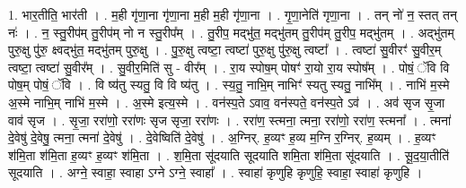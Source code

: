 \documentclass[17pt]{extarticle}
\begin{document}
1. भार॒तीति॒ भार॑ती । . म॒ही गृ॑णा॒ना गृ॑णा॒ना म॒ही म॒ही गृ॑णा॒ना । . गृ॒णा॒नेति॑ गृणा॒ना । . तन् नो॑ न॒ स्तत् तन् नः॑ । . न॒ स्तु॒रीप॑म् तु॒रीप॑म् नो न स्तु॒रीप᳚म् । . तु॒रीप॒ मद्भु॑त॒ मद्भु॑तम् तु॒रीप॑म् तु॒रीप॒ मद्भु॑तम् । . अद्भु॑तम् पुरु॒क्षु पु॑रु॒ क्ष्वद्भु॑त॒ मद्भु॑तम् पुरु॒क्षु । . पु॒रु॒क्षु त्वष्टा॒ त्वष्टा॑ पुरु॒क्षु पु॑रु॒क्षु त्वष्टा᳚ । . त्वष्टा॑ सु॒वीरꣳ॑ सु॒वीर॒म् त्वष्टा॒ त्वष्टा॑ सु॒वीर᳚म् । . सु॒वीर॒मिति॑ सु - वीर᳚म् । . रा॒य स्पोष॒म् पोषꣳ॑ रा॒यो रा॒य स्पोष᳚म् । . पोषं॒ ॅवि वि पोष॒म् पोषं॒ ॅवि । . वि ष्य॑तु स्यतु॒ वि वि ष्य॑तु । . स्य॒तु॒ नाभि॒म् नाभिꣳ॑ स्यतु स्यतु॒ नाभि᳚म् । . नाभि॑ म॒स्मे अ॒स्मे नाभि॒म् नाभि॑ म॒स्मे । . अ॒स्मे इत्य॒स्मे । . वन॑स्प॒ते ऽवाव॒ वन॑स्पते॒ वन॑स्प॒ते ऽव॑ । . अव॑ सृज सृ॒जा वाव॑ सृज । . सृ॒जा॒ ररा॑णो॒ ररा॑णः सृज सृजा॒ ररा॑णः । . ररा॑ण॒ स्त्मना॒ त्मना॒ ररा॑णो॒ ररा॑ण॒ स्त्मना᳚ । . त्मना॑ दे॒वेषु॑ दे॒वेषु॒ त्मना॒ त्मना॑ दे॒वेषु॑ । . दे॒वेष्विति॑ दे॒वेषु॑ । . अ॒ग्निर्. ह॒व्यꣳ ह॒व्य म॒ग्नि र॒ग्निर्. ह॒व्यम् । . ह॒व्यꣳ श॑मि॒ता श॑मि॒ता ह॒व्यꣳ ह॒व्यꣳ श॑मि॒ता । . श॒मि॒ता सू॑दयाति सूदयाति शमि॒ता श॑मि॒ता सू॑दयाति । . सू॒द॒या॒तीति॑ सूदयाति । . अग्ने॒ स्वाहा॒ स्वाहा ऽग्ने ऽग्ने॒ स्वाहा᳚ । . स्वाहा॑ कृणुहि कृणुहि॒ स्वाहा॒ स्वाहा॑ कृणुहि । \newline
\end{document}
